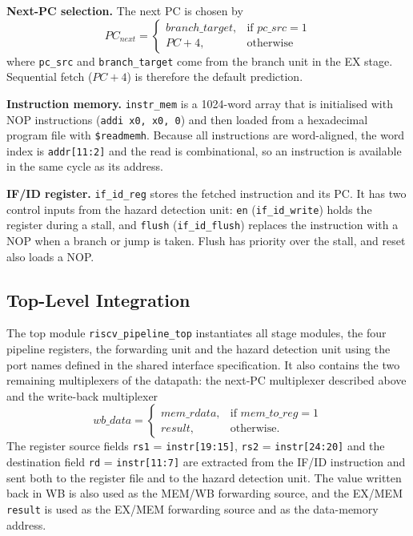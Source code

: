 \textbf{Next-PC selection.} The next PC is chosen by
\begin{equation}
  PC_{next} = \begin{cases}
     branch\_target, & \text{if } pc\_src = 1\\
     PC + 4,         & \text{otherwise}
  \end{cases}
\end{equation}
where \texttt{pc\_src} and \texttt{branch\_target} come from the branch unit in the EX stage.
Sequential fetch ($PC+4$) is therefore the default prediction.

\textbf{Instruction memory.} \texttt{instr\_mem} is a 1024-word array that is initialised with NOP
instructions (\texttt{addi x0, x0, 0}) and then loaded from a hexadecimal program file with
\texttt{\$readmemh}. Because all instructions are word-aligned, the word index is
\texttt{addr[11:2]} and the read is combinational, so an instruction is available in the same cycle
as its address.

\textbf{IF/ID register.} \texttt{if\_id\_reg} stores the fetched instruction and its PC. It has two
control inputs from the hazard detection unit: \texttt{en} (\texttt{if\_id\_write}) holds the
register during a stall, and \texttt{flush} (\texttt{if\_id\_flush}) replaces the instruction with
a NOP when a branch or jump is taken. Flush has priority over the stall, and reset also loads a NOP.

\subsection{Top-Level Integration}

The top module \texttt{riscv\_pipeline\_top} instantiates all stage modules, the four pipeline
registers, the forwarding unit and the hazard detection unit using the port names defined in the
shared interface specification. It also contains the two remaining multiplexers of the datapath:
the next-PC multiplexer described above and the write-back multiplexer
\begin{equation}
  wb\_data = \begin{cases}
     mem\_rdata, & \text{if } mem\_to\_reg = 1\\
     result,     & \text{otherwise.}
  \end{cases}
\end{equation}
The register source fields \texttt{rs1} = \texttt{instr[19:15]}, \texttt{rs2} = \texttt{instr[24:20]}
and the destination field \texttt{rd} = \texttt{instr[11:7]} are extracted from the IF/ID
instruction and sent both to the register file and to the hazard detection unit. The value
written back in WB is also used as the MEM/WB forwarding source, and the EX/MEM \texttt{result} is
used as the EX/MEM forwarding source and as the data-memory address.
